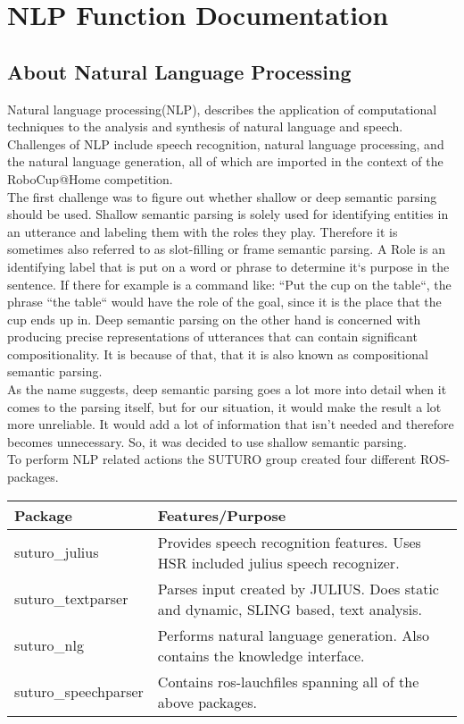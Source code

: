 \documentclass[main.tex]{subfiles}
\begin{document}
\renewcommand{\cleardoublepage}{}   
\renewcommand{\clearpage}{}
\newpage

\chapter{NLP Function Documentation}


\section{About Natural Language Processing}
    Natural language processing(NLP), describes the application of computational techniques to the analysis and synthesis of natural language and speech. Challenges of NLP include speech recognition, natural language processing, and the natural language generation, all of which are imported in the context of the RoboCup@Home competition.\\ 
    The first challenge was to figure out whether shallow or deep semantic parsing should be used. Shallow semantic parsing is solely used for identifying entities in an utterance and labeling them with the roles they play. Therefore it is sometimes also referred to as slot-filling or frame semantic parsing. A Role is an identifying label that is put on a word or phrase to determine it‘s purpose in the sentence. If there for example is a command like: “Put the cup on the table“, the phrase “the table“ would have the role of the goal, since it is the place that the cup ends up in.
Deep semantic parsing on the other hand is concerned with producing precise representations of utterances that can contain significant compositionality. It is because of that, that it is also known as compositional semantic parsing.\\ 
  As the name suggests, deep semantic parsing goes a lot more into detail when it comes to the parsing itself, but for our situation, it would make the result a lot more unreliable. It would add a lot of information that isn't needed and therefore becomes unnecessary. So, it was decided to use shallow semantic parsing.\\
    
    To perform NLP related actions the SUTURO group created four different ROS-packages.

    \begin{tabular}{|l|p{9cm}|}
        \hline
        \textbf{Package} & \textbf{Features/Purpose} \\
        \hline
        suturo\_julius & Provides speech recognition features. Uses HSR included julius speech recognizer. \\
        \hline 
        suturo\_textparser & Parses input created by JULIUS. Does static and dynamic, SLING based, text analysis. \\
        \hline
        suturo\_nlg & Performs natural language generation. Also contains the knowledge interface. \\
        \hline 
        suturo\_speechparser & Contains ros-lauchfiles spanning all of the above packages.\\
        \hline
    \end{tabular}
\end{document}
